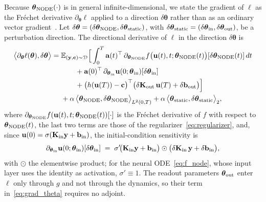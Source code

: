 \documentclass[pdflatex,sn-mathphys-num]{sn-jnl}%
\newcommand{\E}{\mathbb{E}}
\newcommand{\bfu}{\mathbf{u}}
\newcommand{\bfc}{\mathbf{c}}
\newcommand{\bfy}{\mathbf{y}}
\newcommand{\bfb}{\mathbf{b}}
\newcommand{\bfK}{\mathbf{K}}
\newcommand{\bftheta}{\boldsymbol{\theta}}
\newcommand{\bfa}{\mathbf{a}}
\theoremstyle{thmstyleone}%
\theoremstyle{thmstyletwo}%
\theoremstyle{thmstylethree}%
\begin{document}
Because $\bftheta_{\rm NODE}(\cdot)$ is in general infinite-dimensional, we state the gradient of $\ell$ as the Fr\'echet derivative $\partial_{\bftheta}\ell$ applied to a direction $\delta\bftheta$ rather than as an ordinary vector gradient~\cite[Ch.~7]{Luenberger1969}.
%
Let $\delta\bftheta = (\delta\bftheta_{\rm NODE}, \delta\bftheta_{\rm static})$, with $\delta\bftheta_{\rm static} = (\delta\bftheta_{\rm in},\delta\bftheta_{\rm out})$, be a perturbation direction. The directional derivative of $\ell$ in the direction $\delta\bftheta$ is
\begin{equation}\label{eq:grad_theta}
\begin{split}
\big\langle \partial_{\bftheta} \ell(\bftheta), \delta\bftheta \big\rangle
={}& \E_{(\bfy,\bfc)\sim\mathcal{D}}\Big[\int_0^T \bfa(t)^\top\, \partial_{\bftheta_{\rm NODE}} f\big(\bfu(t),t;\bftheta_{\rm NODE}(t)\big)[\delta\bftheta_{\rm NODE}(t)]\, dt \\
&\qquad + \bfa(0)^\top\, \partial_{\bftheta_{\rm in}} \bfu(0;\bftheta_{\rm in})[\delta\bftheta_{\rm in}] \\
&\qquad + \big(h(\bfu(T)) - \bfc\big)^\top\big(\delta\bfK_{\rm out}\,\bfu(T) + \delta\bfb_{\rm out}\big)\Big] \\
&+ \alpha\,\big\langle \bftheta_{\rm NODE}, \delta\bftheta_{\rm NODE}\big\rangle_{L^2(0,T)}
+ \alpha\,\big\langle \bftheta_{\rm static}, \delta\bftheta_{\rm static} \big\rangle_2,
\end{split}
\end{equation}
where $\partial_{\bftheta_{\rm NODE}} f(\bfu(t),t;\bftheta_{\rm NODE}(t))[\cdot]$ is the Fr\'echet derivative of $f$ with respect to $\bftheta_{\rm NODE}(t)$, the last two terms are those of the regularizer~\eqref{eq:regularizer}, and, since $\bfu(0) = \sigma(\bfK_{\rm in}\bfy+\bfb_{\rm in})$, the initial-condition sensitivity is
\begin{equation*}    \partial_{\bftheta_{\rm in}} \bfu(0;\bftheta_{\rm in})[\delta\bftheta_{\rm in}]
    \;=\;
    \sigma'\!\big(\bfK_{\rm in}\bfy+\bfb_{\rm in}\big)\odot\big(\delta\bfK_{\rm in}\,\bfy + \delta\bfb_{\rm in}\big),
\end{equation*}
with $\odot$ the elementwise product; for the neural ODE~\eqref{eq:f_node}, whose input layer uses the identity as activation, $\sigma' \equiv 1$.
%
The readout parameters $\bftheta_{\rm out}$ enter $\ell$ only through $g$ and not through the dynamics, so their term in~\eqref{eq:grad_theta} requires no adjoint.
\end{document}
